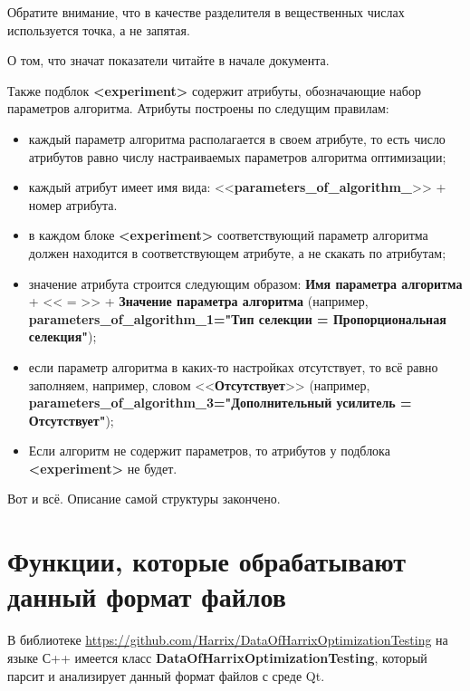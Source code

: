 \documentclass[a4paper,12pt]{article}
\begin{document}
Обратите внимание, что в качестве разделителя в вещественных числах используется точка, а не запятая.

О том, что значат показатели читайте в начале документа.

Также подблок \textbf{<experiment>} содержит атрибуты, обозначающие набор параметров алгоритма. Атрибуты построены по следущим правилам:
\begin{itemize}
\item каждый параметр алгоритма располагается в своем атрибуте, то есть число атрибутов равно числу настраиваемых параметров алгоритма оптимизации;
\item каждый атрибут имеет имя вида: <<\textbf{parameters\_of\_algorithm\_}>> + номер атрибута.
\item в каждом блоке \textbf{<experiment>} соответствующий параметр алгоритма должен находится в соответствующем атрибуте, а не скакать по атрибутам;
\item значение атрибута строится следующим образом: \textbf{Имя параметра алгоритма} + << = >> + \textbf{Значение параметра алгоритма} (например, \textbf{parameters\_of\_algorithm\_1="Тип селекции = Пропорциональная селекция"});
\item если параметр алгоритма в каких-то настройках отсутствует, то всё равно заполняем, например, словом <<\textbf{Отсутствует}>> (например, \textbf{parameters\_of\_algorithm\_3="Дополнительный усилитель = Отсутствует"});
\item Если алгоритм не содержит параметров, то атрибутов у подблока \textbf{<experiment>} не будет.
\end{itemize}

Вот и всё. Описание самой структуры закончено.

\section{Функции, которые обрабатывают данный формат файлов}

В библиотеке \href{https://github.com/Harrix/DataOfHarrixOptimizationTesting} {https://github.com/Harrix/DataOfHarrixOptimizationTesting} на языке С++ имеется класс \textbf{DataOfHarrixOptimizationTesting}, который парсит и анализирует данный формат файлов с среде Qt.
\end{document}
